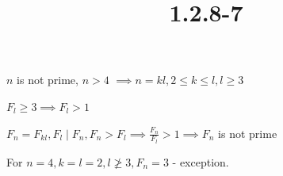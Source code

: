 \documentclass{article}
\title{1.2.8-7}
\begin{document}
\maketitle

$n$ is not prime, $n > 4$ $\implies n = kl, 2 \leq k \leq l, l \geq 3$

$F_l \geq 3 \implies F_l > 1$

$F_n = F_{kl}, F_l \mid F_{n}, F_n > F_l \implies \frac{F_n}{F_l} > 1 \implies F_n$ is not prime

For $n = 4, k=l=2, l \not \geq 3, F_n = 3$ - exception.
\end{document}
